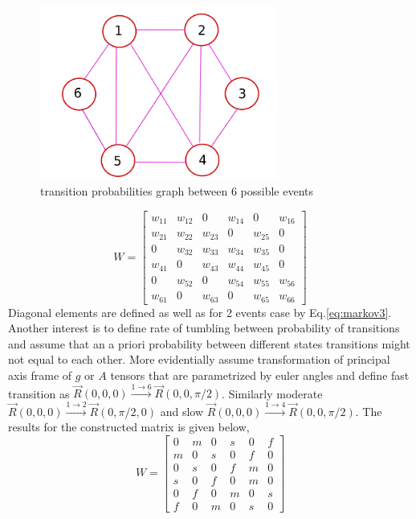 \begin{figure}[h!]
\begin{center}
\includegraphics[width=0.7\textwidth]{figures/chap2/wdiagramm.png}
\caption{transition probabilities graph between 6 possible events}
\label{figure:wdiagramm}
\end{center}
\end{figure}
\begin{equation}\label{eq:Wmat1}
W = \begin{bmatrix}
       w_{11} & w_{12} & 0 & w_{14} & 0 & w_{16}  \\[0.3em]
       w_{21} & w_{22} & w_{23} & 0 & w_{25} & 0  \\[0.3em]
       0 & w_{32} & w_{33} & w_{34} & w_{35} & 0  \\[0.3em]
       w_{41} & 0 & w_{43} & w_{44} & w_{45} & 0 \\[0.3em]
       0 & w_{52} & 0 & w_{54} & w_{55} & w_{56} \\[0.3em]
       w_{61} & 0 & w_{63} & 0 & w_{65} & w_{66} 
     \end{bmatrix}
\end{equation}
Diagonal elements are defined as well as for 2 events case by Eq.\ref{eq:markov3}. Another interest is to define rate of tumbling between probability of transitions and assume that an a priori probability between different states transitions might not equal to each other. More evidentially assume transformation of principal axis frame of $g$ or $A$ tensors that are parametrized by euler angles and define  fast transition as $\vec{R}(0,0,0)\xrightarrow {1\rightarrow 6}\vec{R}(0,0,\pi/2)$. Similarly moderate $\vec{R}(0,0,0)\xrightarrow {1\rightarrow 2}\vec{R}(0,\pi/2,0)$  and slow $\vec{R}(0,0,0)\xrightarrow {1\rightarrow 4}\vec{R}(0,0,\pi/2)$. The results for the constructed matrix is given below,   
\begin{equation}\label{eq:Wmat2}
W = \begin{bmatrix}
       0 & m & 0 & s & 0 & f  \\[0.3em]
       m & 0 & s & 0 & f & 0  \\[0.3em]
       0 & s & 0 & f & m & 0  \\[0.3em]
       s & 0 & f & 0 & m & 0 \\[0.3em]
       0 & f & 0 & m & 0 & s \\[0.3em]
       f & 0 & m & 0 & s & 0 
     \end{bmatrix}
\end{equation}
